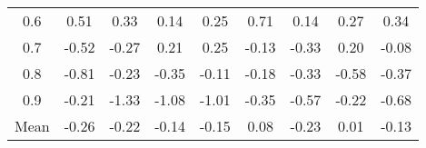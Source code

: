 \documentclass[11pt,a4paper]{report}
\begin{document}
\begin{longtable}{ | c || c | c | c | c | c | c | c || c |}
0.6 &  \cellcolor[HTML]{EFEFFF} 0.51 &  \cellcolor[HTML]{F7F7FF} 0.33 &  \cellcolor[HTML]{FFFFFF} 0.14 &  \cellcolor[HTML]{F7F7FF} 0.25 &  \cellcolor[HTML]{EFEFFF} 0.71 &  \cellcolor[HTML]{FFFFFF} 0.14 &  \cellcolor[HTML]{F7F7FF} 0.27 &  \cellcolor[HTML]{F7F7FF} 0.34 \\
0.7 &  \cellcolor[HTML]{FFEFEF} -0.52 &  \cellcolor[HTML]{FFF7F7} -0.27 &  \cellcolor[HTML]{F7F7FF} 0.21 &  \cellcolor[HTML]{F7F7FF} 0.25 &  \cellcolor[HTML]{FFFFFF} -0.13 &  \cellcolor[HTML]{FFF7F7} -0.33 &  \cellcolor[HTML]{F7F7FF} 0.20 &  \cellcolor[HTML]{FFFFFF} -0.08 \\
0.8 &  \cellcolor[HTML]{FFE7E7} -0.81 &  \cellcolor[HTML]{FFF7F7} -0.23 &  \cellcolor[HTML]{FFF7F7} -0.35 &  \cellcolor[HTML]{FFFFFF} -0.11 &  \cellcolor[HTML]{FFF7F7} -0.18 &  \cellcolor[HTML]{FFF7F7} -0.33 &  \cellcolor[HTML]{FFEFEF} -0.58 &  \cellcolor[HTML]{FFF7F7} -0.37 \\
0.9 &  \cellcolor[HTML]{FFF7F7} -0.21 &  \cellcolor[HTML]{FFDFDF} -1.33 &  \cellcolor[HTML]{FFE7E7} -1.08 &  \cellcolor[HTML]{FFE7E7} -1.01 &  \cellcolor[HTML]{FFF7F7} -0.35 &  \cellcolor[HTML]{FFEFEF} -0.57 &  \cellcolor[HTML]{FFF7F7} -0.22 &  \cellcolor[HTML]{FFEFEF} -0.68 \\
\hline
\hline
Mean  &  \cellcolor[HTML]{FFF7F7} -0.26 &  \cellcolor[HTML]{FFF7F7} -0.22 &  \cellcolor[HTML]{FFFFFF} -0.14 &  \cellcolor[HTML]{FFFFFF} -0.15 &  \cellcolor[HTML]{FFFFFF} 0.08 &  \cellcolor[HTML]{FFF7F7} -0.23 &  \cellcolor[HTML]{FFFFFF} 0.01 &  \cellcolor[HTML]{FFFFFF} -0.13 \\
\hline
\end{longtable}
\end{document}
